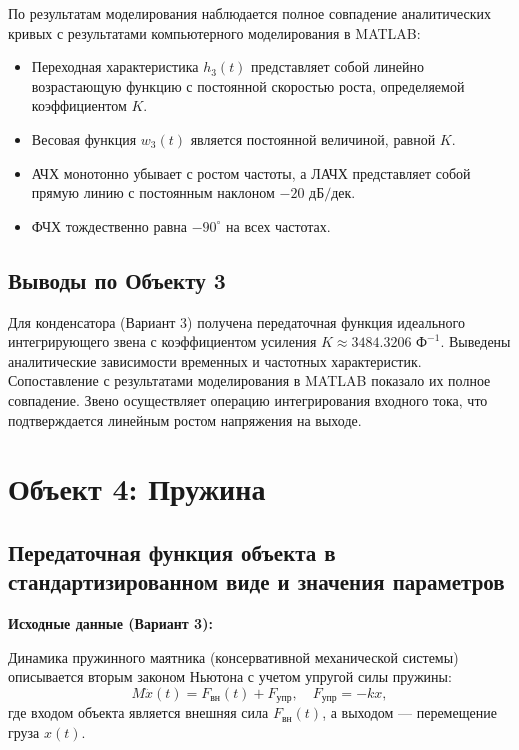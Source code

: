 \documentclass[12pt, a4paper]{article}
\begin{document}
По результатам моделирования наблюдается полное совпадение аналитических кривых с результатами компьютерного моделирования в MATLAB:
\begin{itemize}
    \item Переходная характеристика $h_3(t)$ представляет собой линейно возрастающую функцию с постоянной скоростью роста, определяемой коэффициентом $K$.
    \item Весовая функция $w_3(t)$ является постоянной величиной, равной $K$.
    \item АЧХ монотонно убывает с ростом частоты, а ЛАЧХ представляет собой прямую линию с постоянным наклоном $-20\text{ дБ/дек}$.
    \item ФЧХ тождественно равна $-90^\circ$ на всех частотах.
\end{itemize}




\subsection{Выводы по Объекту 3}

Для конденсатора (Вариант 3) получена передаточная функция идеального интегрирующего звена с коэффициентом усиления $K \approx 3484.3206\text{ Ф}^{-1}$. Выведены аналитические зависимости временных и частотных характеристик. Сопоставление с результатами моделирования в MATLAB показало их полное совпадение. Звено осуществляет операцию интегрирования входного тока, что подтверждается линейным ростом напряжения на выходе.

\newpage
\section{Объект 4: Пружина}

\subsection{Передаточная функция объекта в стандартизированном виде и значения параметров}

\textbf{Исходные данные (Вариант 3):}

Динамика пружинного маятника (консервативной механической системы) описывается вторым законом Ньютона с учетом упругой силы пружины:
\begin{equation}
    M\ddot{x}(t) = F_{\text{вн}}(t) + F_{\text{упр}}, \quad F_{\text{упр}} = -kx,
\end{equation}
где входом объекта является внешняя сила $F_{\text{вн}}(t)$, а выходом — перемещение груза $x(t)$.
\end{document}
